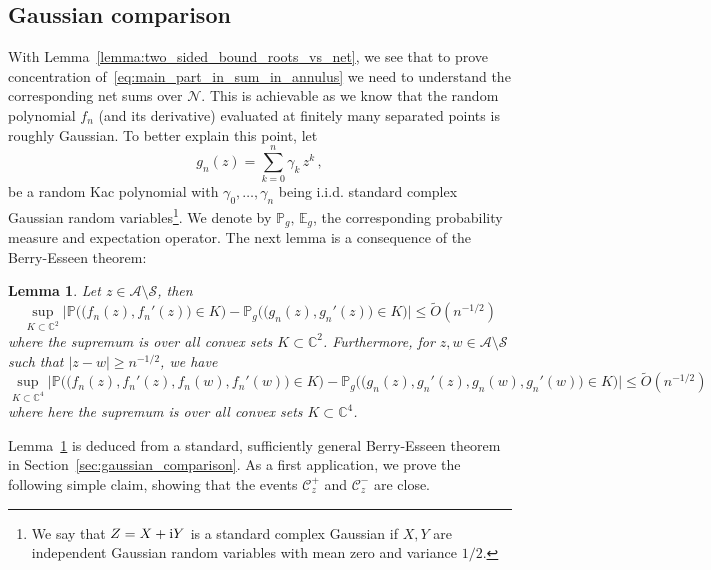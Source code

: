 \documentclass[11pt]{amsart}
\newtheorem{lemma}[theorem]{Lemma}
\theoremstyle{remark}
\theoremstyle{definition}
\newcommand{\bC}{\mathbb C}
\newcommand{\bP}{\mathbb P}
\newcommand{\bE}{\mathbb E}
\newcommand{\cA}{\mathcal A}
\renewcommand{\P}{\mathbb P}
\newcommand{\cC}{\mathcal C}
\newcommand{\Otilde}{\widetilde{O}}
\newcommand{\I}{{\rm i}}
\begin{document}
    \subsection{Gaussian comparison}
    \label{subsec:gaussian_comparison}
    With Lemma~\ref{lemma:two_sided_bound_roots_vs_net}, we see that to prove concentration of~\eqref{eq:main_part_in_sum_in_annulus} we need to understand the corresponding net sums over $\mathcal{N}$. This is achievable as we know that the random polynomial $f_n$ (and its derivative) evaluated at finitely many separated points is roughly Gaussian. To better explain this point, let 
    \begin{equation}
    \label{eq:def_of_random_polynomial_with_gaussian_coefficients}
        g_n(z) = \sum_{k=0}^{n} \gamma_k \, z^k \, , 
    \end{equation}
    be a random Kac polynomial with $\gamma_0,\ldots,\gamma_n$ being i.i.d. standard complex Gaussian random variables\footnote{We say that $Z= X+ \I Y$ is a standard complex Gaussian if $X,Y$ are independent Gaussian random variables with mean zero and variance $1/2$. }. We denote by $\bP_g, \, \bE_g$, the corresponding probability measure and expectation operator. The next lemma is a consequence of the Berry-Esseen theorem:
    \begin{lemma}
        \label{lemma:berry_esseen_in_annulus}
        Let $z\in \cA\setminus \mathcal{S}$, then
        \begin{equation*}
        \sup_{K \subset \bC^2}\Big| \P\Big( \big(f_n(z),f_n'(z)\big) \in K \Big) - \P_g\Big( \big(g_n(z),g_n'(z)\big) \in K \Big) \Big| \leq 
        \Otilde(n^{-1/2})
        \end{equation*}
        where the supremum is over all convex sets $K\subset \bC^2$. Furthermore, for $z,w\in \cA\setminus \mathcal{S}$ such that $|z-w|\ge n^{-1/2}$, we have
        \begin{equation*}
        \sup_{K \subset \bC^4}\Big| \P\Big( \big(f_n(z),f_n'(z),f_n(w),f_n'(w)\big) \in K \Big) - \P_g\Big( \big(g_n(z),g_n'(z),g_n(w),g_n'(w)\big) \in K \Big) \Big| \leq 
        \Otilde(n^{-1/2})
        \end{equation*}
        where here the supremum is over all convex sets $K\subset \bC^4$. 
        \end{lemma}
    Lemma~\ref{lemma:berry_esseen_in_annulus} is deduced from a standard, sufficiently general Berry-Esseen theorem in Section~\ref{sec:gaussian_comparison}. As a first application, we prove the following simple claim, showing that the events $\cC_z^+$ and $\cC_z^-$ are close.
\end{document}
